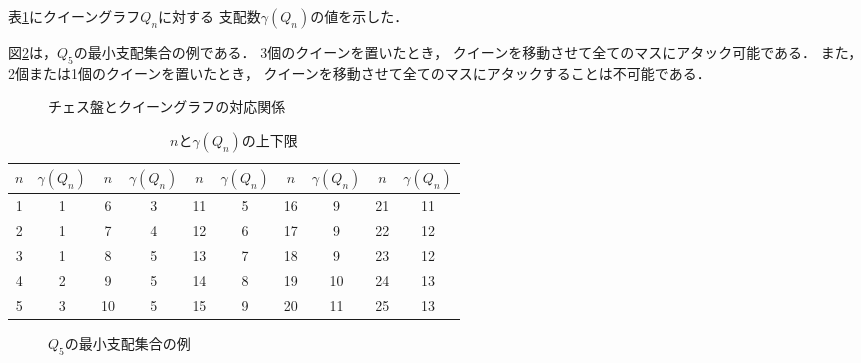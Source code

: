 表\ref{tb:queen_n}にクイーングラフ$Q_n$に対する
支配数$\gamma(Q_n)$の値を示した．


図\ref{ex:queengraph5}は，$Q_5$の最小支配集合の例である．
3個のクイーンを置いたとき，
クイーンを移動させて全てのマスにアタック可能である．
また，2個または1個のクイーンを置いたとき，
クイーンを移動させて全てのマスにアタックすることは不可能である．

\begin{figure}[htb]
  \label{ex:queengraph_3}
 \begin{minipage}[b]{0.35\linewidth}
  \centering
  
 \end{minipage} 
 \begin{minipage}[b]{0.2\linewidth}
  \centering
  
 \end{minipage}
 \begin{minipage}[b]{0.35\linewidth}
  \centering
  
 \end{minipage}
 \caption{チェス盤とクイーングラフの対応関係}
\end{figure}

\begin{table}[hbtp]
   \centering
   \caption{$n$と$\gamma(Q_n)$の上下限}
   \begin{tabular}{c|c||c|c||c|c||c|c||c|c} \hline
    $n$ & $\gamma(Q_{n})$ & $n$ & $\gamma(Q_{n})$ &$n$ & $\gamma(Q_{n})$ &$n$ & $\gamma(Q_{n})$ &$n$ & $\gamma(Q_{n})$ \\ \hline \hline
    1 &1 &6 &3 &11 &5 &16 &9 &21 &11\\ \hline
    2 &1 &7 &4 &12 &6 &17 &9 &22 &12\\ \hline
    3 &1 &8 &5 &13 &7 &18 &9 &23 &12\\ \hline
    4 &2 &9 &5 &14 &8 &19 &10 &24 &13\\ \hline
    5 &3 &10 &5 &15 &9 &20 &11 &25 &13\\ \hline
   \end{tabular}
   \label{tb:queen_n}
  \end{table}


\begin{figure}[htb]
  \centering
  
  \caption{$Q_5$の最小支配集合の例}
  \label{ex:queengraph5}
\end{figure}

